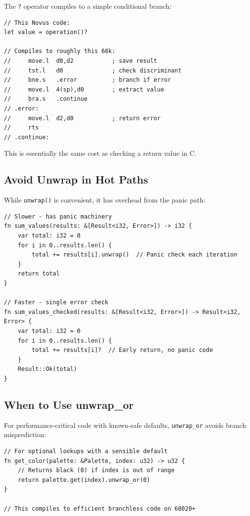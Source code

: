 The \texttt{?} operator compiles to a simple conditional branch:

\begin{lstlisting}
// This Novus code:
let value = operation()?

// Compiles to roughly this 68k:
//     move.l  d0,d2           ; save result
//     tst.l   d0              ; check discriminant
//     bne.s   .error          ; branch if error
//     move.l  4(sp),d0        ; extract value
//     bra.s   .continue
// .error:
//     move.l  d2,d0           ; return error
//     rts
// .continue:
\end{lstlisting}

This is essentially the same cost as checking a return value in C.

\subsection{Avoid Unwrap in Hot Paths}

While \texttt{unwrap()} is convenient, it has overhead from the panic path:

\begin{lstlisting}
// Slower - has panic machinery
fn sum_values(results: &[Result<i32, Error>]) -> i32 {
    var total: i32 = 0
    for i in 0..results.len() {
        total += results[i].unwrap()  // Panic check each iteration
    }
    return total
}

// Faster - single error check
fn sum_values_checked(results: &[Result<i32, Error>]) -> Result<i32, Error> {
    var total: i32 = 0
    for i in 0..results.len() {
        total += results[i]?  // Early return, no panic code
    }
    Result::Ok(total)
}
\end{lstlisting}

\subsection{When to Use unwrap\_or}

For performance-critical code with known-safe defaults, \texttt{unwrap\_or} avoids branch misprediction:

\begin{lstlisting}
// For optional lookups with a sensible default
fn get_color(palette: &Palette, index: u32) -> u32 {
    // Returns black (0) if index is out of range
    return palette.get(index).unwrap_or(0)
}

// This compiles to efficient branchless code on 68020+
\end{lstlisting}

